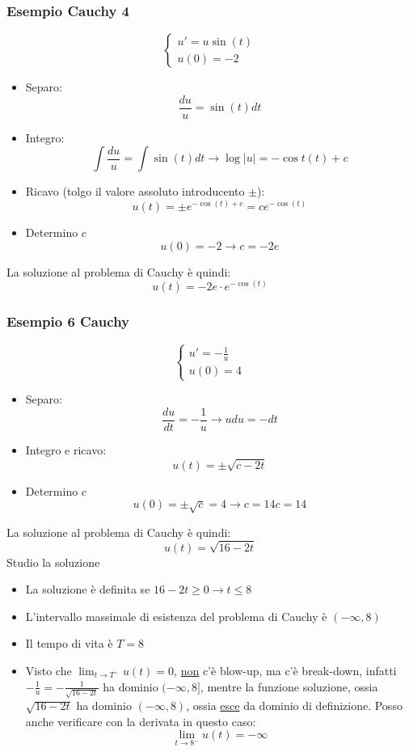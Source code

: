 \subsubsection*{Esempio Cauchy 4}
\[
	\begin{cases}
		u'= u \sin \left( t \right) \\
		u\left( 0 \right) = -2
	\end{cases}
\]
\begin{itemize}
	\item Separo:
	      \[
		      \frac{du}{u}= \sin \left( t \right) dt
	      \]
	\item Integro:
	      \[
		      \int \frac{du}{u}= \int \sin \left( t \right) dt \rightarrow \log \left| u\right|= - \cos t\left( t \right)  + c
	      \]
	\item Ricavo (tolgo il valore assoluto introducento $ \pm $):
	      \[
		      u\left( t \right) = \pm e^{-\cos \left( t \right)  + c}= c e ^{-\cos \left( t \right) }
	      \]
	\item Determino $ c $
	      \[
		      u\left( 0 \right) = -2 \rightarrow c = -2e
	      \]
\end{itemize}
La soluzione al problema di Cauchy è quindi:
\[
	u\left( t \right) = -2e \cdot e^{-\cos \left( t \right) }
\]
\subsubsection*{Esempio 6 Cauchy}
\[
	\begin{cases}
		u' = -\frac{1}{u} \\
		u\left( 0 \right) =4
	\end{cases}
\]
\begin{itemize}
	\item Separo:
	      \[
		      \frac{du}{dt}= -\frac{1}{u} \rightarrow u du = -dt
	      \]
	\item Integro e ricavo:
	      \[
		      u\left( t \right) = \pm \sqrt{c - 2t}
	      \]
	\item Determino $ c $
	      \[
		      u\left( 0 \right) = \pm \sqrt{c} =4 \rightarrow c=14 c=14
	      \]
\end{itemize}
La soluzione al problema di Cauchy è quindi:
\[
	u\left( t \right) = \sqrt{16-2t}
\]
Studio la soluzione
\begin{itemize}
	\item La soluzione è definita se $ 16 - 2t \ge 0  \rightarrow t \le 8$
	\item L'intervallo massimale di esistenza del problema di Cauchy è $ \left( -\infty, 8 \right)  $
	\item Il tempo di vita è $ T=8 $
	\item Visto che $ \lim_{t \to T^{-}} u\left( t \right)  = 0 $, \underline{non} c'è blow-up, ma c'è break-down, infatti $ -\frac{1}{u}=-\frac{1}{\sqrt{16-2t} } $ ha dominio $ (-\infty, 8] $, mentre la funzione soluzione, ossia $ \sqrt{16-2t}  $ ha dominio $ \left( -\infty, 8 \right)  $, ossia \underline{esce} da dominio di definizione. Posso anche verificare con la derivata in questo caso:
	      \[
		      \lim_{t \to 8^{-}} u\left( t \right)  = - \infty
	      \]
\end{itemize}
